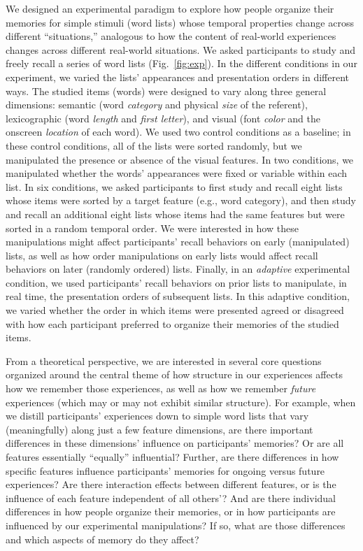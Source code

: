 \documentclass[11pt]{article}
\begin{document}
We designed an experimental paradigm to explore how people organize their
memories for simple stimuli (word lists) whose temporal properties change
across different ``situations,'' analogous to how the content of real-world
experiences changes across different real-world situations. We asked
participants to study and freely recall a series of word lists
(Fig.~\ref{fig:exp}). In the different conditions in our experiment, we varied
the lists' appearances and presentation orders in different ways. The studied
items (words) were designed to vary along three general dimensions: semantic
(word \textit{category} and physical \textit{size} of the referent),
lexicographic (word \textit{length} and \textit{first letter}), and visual
(font \textit{color} and the onscreen \textit{location} of each word). We used
two control conditions as a baseline; in these control conditions, all of the
lists were sorted randomly, but we manipulated the presence or absence of the
visual features. In two conditions, we manipulated whether the words'
appearances were fixed or variable within each list. In six conditions, we
asked participants to first study and recall eight lists whose items were
sorted by a target feature (e.g., word category), and then study and recall an
additional eight lists whose items had the same features but were sorted
in a random temporal order. We were interested in how these manipulations
might affect participants' recall behaviors on early (manipulated) lists, as well
as how order manipulations on early lists would affect recall behaviors on later
(randomly ordered) lists. Finally, in an \textit{adaptive} experimental
condition, we used participants' recall behaviors on prior lists to manipulate,
in real time, the presentation orders of subsequent lists. In this adaptive
condition, we varied whether the order in which items were presented agreed
or disagreed with how each participant preferred to organize their memories of
the studied items.


From a theoretical perspective, we are interested in several core questions
organized around the central theme of how structure in our experiences affects
how we remember those experiences, as well as how we remember
\textit{future} experiences (which may or may not exhibit similar structure).
For example, when we distill participants' experiences down to simple word
lists that vary (meaningfully) along just a few feature dimensions, are there
important differences in these dimensions' influence on participants' memories? Or
are all features essentially ``equally'' influential? Further, are there
differences in how specific features influence participants' memories for
ongoing versus future experiences? Are there interaction effects between
different features, or is the influence of each feature independent of all others'?
And are there individual differences in how people organize their
memories, or in how participants are influenced by our experimental manipulations? If
so, what are those differences and which aspects of memory do they affect?
\end{document}
